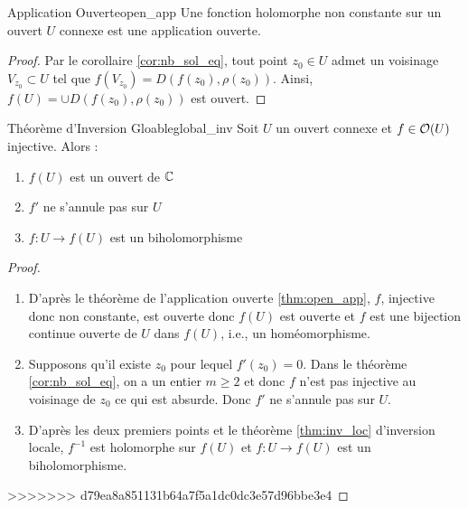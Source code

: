 \documentclass{cours}
\begin{document}
\begin{théorème}{Application Ouverte}{open_app}
    Une fonction holomorphe non constante sur un ouvert $U$ connexe est une application ouverte.
\end{théorème}
\begin{proof}
    Par le corollaire \ref{cor:nb_sol_eq}, tout point $z_{0} \in U$ admet un voisinage $V_{z_{0}} \subset U$ tel que $f(V_{z_{0}}) = D(f(z_{0}), \rho(z_{0}))$. Ainsi, $f(U) = \cup D(f(z_{0}), \rho(z_{0}))$ est ouvert. 
\end{proof}
\begin{théorème}{Théorème d'Inversion Gloable}{global_inv}
    Soit $U$ un ouvert connexe et $f \in \mathcal{O}(U)$ injective. Alors : 
    \begin{enumerate}
        \item $f(U)$ est un ouvert de $\mathbb{C}$
        \item $f'$ ne s'annule pas sur $U$
        \item $f : U \to f(U)$ est un biholomorphisme
    \end{enumerate}
\end{théorème}
\begin{proof}
    \begin{enumerate}
        \item D'après le théorème de l'application ouverte \ref{thm:open_app}, $f$, injective donc non constante, est ouverte donc $f(U)$ est ouverte et $f$ est une bijection continue ouverte de $U$ dans $f(U)$, i.e., un homéomorphisme. 
        \item Supposons qu'il existe $z_{0}$ pour lequel $f'(z_{0}) = 0$. Dans le théorème \ref{cor:nb_sol_eq}, on a un entier $m \geq 2$ et donc $f$ n'est pas injective au voisinage de $z_{0}$ ce qui est absurde. Donc $f'$ ne s'annule pas sur $U$. 
        \item D'après les deux premiers points et le théorème \ref{thm:inv_loc} d'inversion locale, $f^{-1}$ est holomorphe sur $f(U)$ et $f: U \to f(U)$ est un biholomorphisme.
    \end{enumerate}
>>>>>>> d79ea8a851131b64a7f5a1dc0dc3e57d96bbe3e4
\end{proof}
\end{document}
